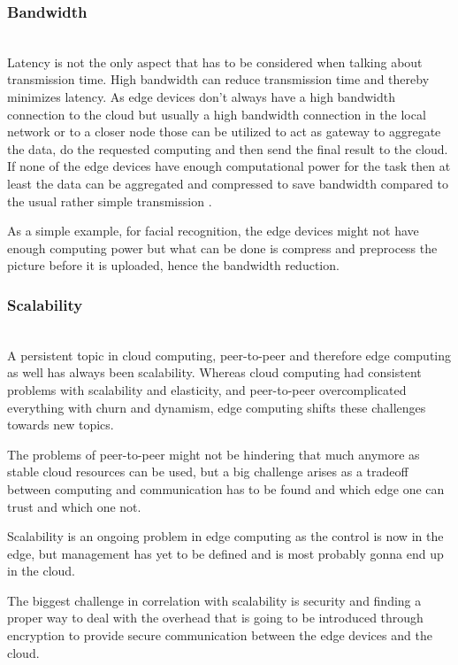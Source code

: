 \subsubsection{Bandwidth}\hspace*{\fill} \\
Latency is not the only aspect that has to be considered when talking about transmission time. High bandwidth can reduce transmission time and thereby minimizes latency.
As edge devices don’t always have a high bandwidth connection to the cloud but usually a high bandwidth connection in the local network or to a closer node those can be utilized to act as gateway to aggregate the data, do the requested computing and then send the final result to the cloud. If none of the edge devices have enough computational power for the task then at least the data can be aggregated and compressed to save bandwidth compared to the usual rather simple transmission \cite{7488250}.

As a simple example, for facial recognition, the edge devices might not have enough computing power but what can be done is compress and preprocess the picture before it is uploaded, hence the bandwidth reduction.

\subsubsection{Scalability}\hspace*{\fill} \\
A persistent topic in cloud computing, peer-to-peer and therefore edge computing as well has always been scalability.
Whereas cloud computing had consistent problems with scalability and elasticity, and peer-to-peer overcomplicated everything with churn and dynamism, edge computing shifts these challenges towards new topics.

The problems of peer-to-peer might not be hindering that much anymore as stable cloud resources can be used, but a big challenge arises as a tradeoff between computing and communication has to be found \cite{7488250}\cite{GarciaLopez:2015:ECV:2831347.2831354} and which edge one can trust and which one not.

Scalability is an ongoing problem in edge computing as the control is now in the edge, but management has yet to be defined and is most probably gonna end up in the cloud.

The biggest challenge in correlation with scalability is security and finding a proper way to deal with the overhead that is going to be introduced through encryption to provide secure communication between the edge devices and the cloud.

